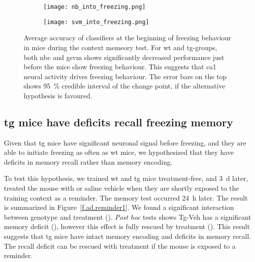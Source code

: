 \begin{figure}[h]
    \begin{subfigure}[h]{\textwidth}
        \texttt{[image: nb\_into\_freezing.png]}
        \caption{\label{f.ad.nb_into_f}}
    \end{subfigure}
    \begin{subfigure}[h]{\textwidth}
        \texttt{[image: svm\_into\_freezing.png]}
        \caption{\label{f.ad.svm_into_f}}
    \end{subfigure}
    \caption{Average accuracy of classifiers at the beginning of freezing behaviour in mice during the context memeory test. For \gls{wt} and \gls{tg}-\glu groups, both \gls{nbc} and \gls{gsvm} shows significantly decreased performance just before the mice show freezing behaviour. This suggests that \gls{ca1} neural activity drives freezing behaviour. The error bars on the top shows \SI{95}{\percent} credible interval of the change point, if the alternative hypothesis is favoured. \label{f.ad.into_f}}
\end{figure}


\subsection{\Gls{tg} mice have deficits recall freezing memory}


Given that \gls{tg} mice have significant neuronal signal before freezing, and they are able to initiate freezing as often as \gls{wt} mice, we hypothesized that they have deficits in memory recall rather than memory encoding. 

To test this hypothesis, we trained \gls{wt} and \gls{tg} mice treatment-free, and \SI{3}{\day} later, treated the mouse with \tglu or saline vehicle when they are shortly exposed to the training context as a reminder. The memory test occurred \SI{24}{\hour} later. The result is summarized in Figure~\ref{f.ad.reminder1}. We found a significant interaction between genotype and treatment (). \textit{Post hoc} tests shows Tg-Veh has a significant memory deficit (), however this effect is fully rescued by \tglu treatment (). This result suggests that \gls{tg} mice have intact memory encoding and deficits in memory recall. The recall deficit can be rescued with \tglu treatment if the mouse is exposed to a reminder.

